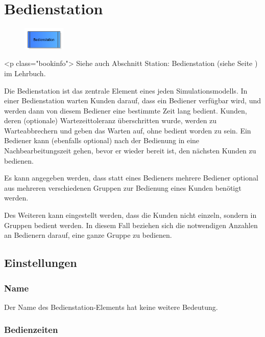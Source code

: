 \section{Bedienstation}
\label{ref:ModelElementProcess}

\begin{figure}
\vspace{-22pt}
\includegraphics[width=2cm]{imageModelElementProcess.png}
\vspace{-22pt}
\end{figure}

<p class="bookinfo">
Siehe auch Abschnitt Station: Bedienstation (siehe Seite \pageref{ref:book:5.3.3}) im Lehrbuch.

Die Bedienstation ist das zentrale Element eines jeden Simulationsmodells. In einer Bedienstation warten Kunden darauf,
dass ein Bediener verfügbar wird, und werden dann von diesem Bediener eine bestimmte Zeit lang bedient. Kunden, deren
(optionale) Wartezeittoleranz überschritten wurde, werden zu Warteabbrechern und geben das Warten auf, ohne bedient
worden zu sein. Ein Bediener kann (ebenfalls optional) nach der Bedienung in eine Nachbearbeitungszeit gehen, bevor
er wieder bereit ist, den nächsten Kunden zu bedienen.

Es kann angegeben werden, dass statt eines Bedieners mehrere Bediener optional aus mehreren verschiedenen Gruppen zur Bedienung
eines Kunden benötigt werden.

Des Weiteren kann eingestellt werden, dass die Kunden nicht einzeln, sondern in Gruppen bedient werden. In diesem Fall
beziehen sich die notwendigen Anzahlen an Bedienern darauf, eine ganze Gruppe zu bedienen.

\subsection*{Einstellungen}

\subsubsection*{Name}

Der Name des Bedienstation-Elements hat keine weitere Bedeutung.

\subsubsection*{Bedienzeiten}

